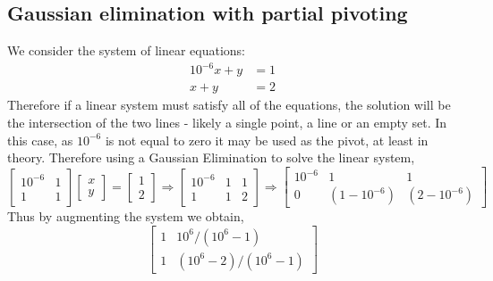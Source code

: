 \documentclass[7pt]{article}
\begin{document}
\subsection*{Gaussian elimination with partial pivoting}
We consider the system of linear equations:
\begin{equation*}
\begin{split}
10^{-6}x + y & = 1 \\
x + y & = 2
\end{split}
\end{equation*}
Therefore if a linear system must satisfy all of the equations, the solution will be the intersection of the two lines - likely a single point, a line or an empty set. In this case, as $10^{-6}$ is not equal to zero it may be used as the pivot, at least in theory. Therefore using a Gaussian Elimination to solve the linear system, 
\begin{equation*}
\left[
\begin{array}{cc}%
10^{-6}& 1  \\  
1& 1
\end{array}  
\right]
\left[
\begin{array}{c}%
x \\  
y
\end{array}  
\right]
=
\left[
\begin{array}{c}%
1 \\  
2
\end{array}  
\right]
\Rightarrow
\left[
\begin{array}{cc|c}%
10^{-6}& 1 & 1 \\  
1& 1& 2
\end{array}  
\right]
\Rightarrow
\left[
\begin{array} {cc|c}%
10^{-6}& 1 & 1 \\  
0 & (1 - 10^{-6})& (2 - 10^{-6})
\end{array}  
\right]
 \end{equation*}
Thus by augmenting the system we obtain, 
\begin{equation*}
\left[
\begin{array}{c|c} %
 1 & {10^6}/{(10^6 - 1)} \\  
1 & {(10^6 - 2)}/{(10^6 - 1)} 
\end{array}  
\right]
\end{equation*}
\end{document}
